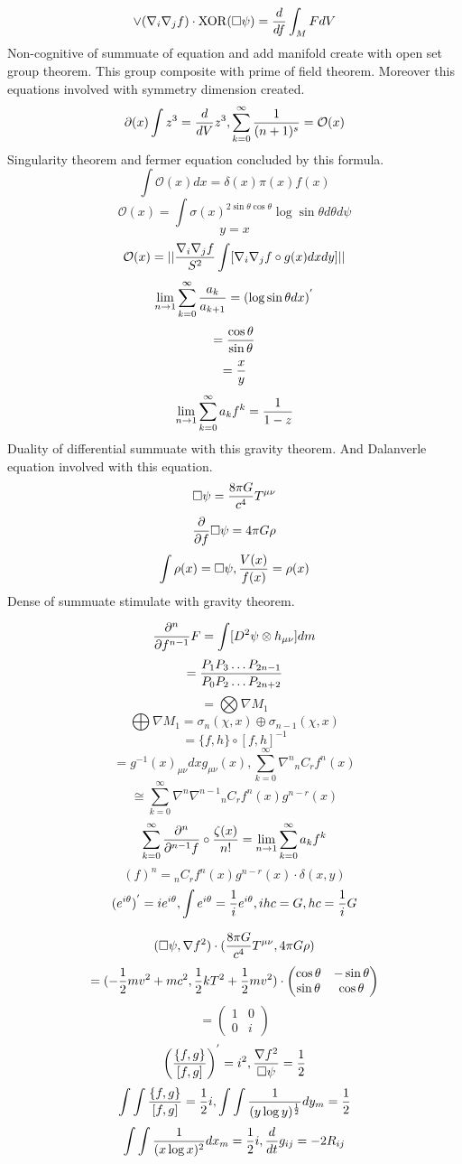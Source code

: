 \documentclass{jsarticle}
\begin{document}
	$$ \vee(\nabla_{i}\nabla_{j}f) \cdot \mathrm{XOR}(\square \psi)= {d \over df}\int_M F dV $$
Non-cognitive of summuate of equation and add manifold create with open set group theorem.
This group composite with prime of field theorem. Moreover this equations involved with symmetry dimension created.
	$$ \partial (x) \int z^3 = {d \over dV}z^3, \sum_{k=0}^{\infty}{1 \over (n + 1)^s} = \mathcal{O}(x) $$
	Singularity theorem and fermer equation concluded by this formula.
	$$ \int \mathcal{O}(x)dx = \delta(x)\pi(x)f(x) $$
	$$ \mathcal{O}(x) = \int \sigma(x)^{2\sin \theta \cos \theta}\log \sin \theta d\theta d\psi $$
	$$ y = x $$
	$$ \mathcal{O}(x) = ||{\nabla_{i}\nabla_{j}f \over S^2} \int [\nabla_{i}\nabla_{j}f \circ g(x)dxdy]|| $$
	$$ \lim\limits_{n \to 1}\sum_{k=0}^{\infty}{a_k \over a_{k+1}} = (\log \sin \theta dx)^{'} $$
	$$ = {\cos \theta \over \sin \theta} $$
	$$ = {x \over y} $$
	$$ \lim\limits_{n \to 1}\sum_{k=0}^{\infty}a_k f^k = {1 \over 1 - z} $$
	Duality of differential summuate with this gravity theorem.
	And Dalanverle equation involved with this equation.
	$$ \square \psi = {8\pi G \over c^4}T^{\mu\nu} $$
	$$ {\partial \over \partial f}\square \psi = 4 \pi G \rho $$
	$$ \int \rho (x) = \square \psi, {V(x) \over f(x)} = \rho(x) $$
	Dense of summuate stimulate with gravity theorem.

	$$ {\partial^n \over \partial f^{n-1}}F = \int[D^2 \psi \otimes h_{\mu\nu}]dm $$
	$$ = {P_1P_3\dots P_{2n-1} \over P_0 P_2\dots P_{2n+2}}$$ 
	$$ = \bigotimes \nabla M_1 $$
	$$ \bigoplus \nabla M_1 = \sigma_n (\chi,x) \oplus \sigma_{n-1}(\chi,x) $$
	$$ = \{f,h\}\circ [f,h]^{-1}  $$
	$$ = g^{-1}(x)_{\mu\nu} dx g_{\mu\nu}(x), \sum_{k=0}^{\infty} \nabla^n {}_nC_r f^n(x) $$ 
        $$ \cong \sum_{k=0}^{\infty} \nabla^n \nabla^{n-1} {}_nC_r f^n(x)g^{n-r}(x) $$
	$$ \sum_{k=0}^{\infty}{\partial^n \over \partial^{n-1}f} \circ {\zeta(x) \over n!} = 
	\lim_{n \to 1} \sum_{k=0}^{\infty} a_k f^k$$ 
	$$ (f)^n = {}_nC_r f^n(x)g^{n-r}(x)\cdot \delta(x,y) $$
	$$ (e^{i \theta})^{'} = i e^{i \theta}, \int e^{i \theta} = {1 \over i}e^{i \theta}, ihc = G, hc = 
	{1 \over i}G $$


	$$ (\square \psi, \nabla f^2)\cdot ({8\pi G \over c^4}T^{\mu\nu}, 4\pi G \rho) $$
	$$ = (-{1 \over 2}mv^2 + mc^2, {1 \over2}kT^2 + {1 \over 2}mv^2) \cdot \begin{pmatrix}
		\cos \theta & - \sin \theta \\
	\sin \theta & \cos \theta \end{pmatrix} $$
		$$ = \begin{pmatrix} 1 & 0 \\
	0 & i \end{pmatrix} $$
		$$ \left({\{f,g\} \over [f,g]}\right)^{'} = i^2, {\nabla f^2 \over \square \psi} = {1 \over 2} $$	
			$$ \int \int {\{f,g\} \over [f,g]} = {1 \over 2}i, 
			 \int \int {1 \over (y \log y)^{1 \over 2}}dy_m = {1 \over 2} $$
			 $$ \int \int {1 \over (x \log x)^2}dx_m = {1 \over 2}i, {d \over dt}g_{ij} = - 2 R_{ij} $$
\end{document}
